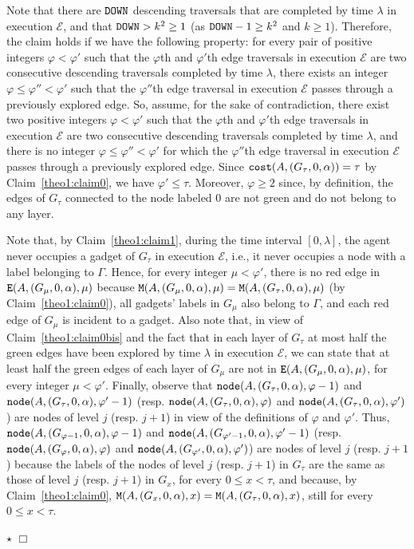 \documentclass[11pt]{article}
\newcommand{\qed}{\hfill $\Box$ \bigbreak}
\newenvironment{proof}{\noindent {\bf Proof.}}{\qed}
\newenvironment{proofclaim}{\noindent{\bf Proof of the claim.}}{\hfill$\star$}
\begin{document}
{\begin{proof}
\begin{proofclaim}
Note that there are ${\tt DOWN}$ descending traversals that are completed by time $\lambda$ in execution $\mathcal{E}$, and that ${\tt DOWN}>k^2\geq 1$ (as ${\tt DOWN}-1\geq k^2$ and $k\geq1$). Therefore, the claim holds if we have the following property: for every pair of positive integers $\varphi<\varphi'$ such that the $\varphi$th and $\varphi'$th edge traversals in execution $\mathcal{E}$ are two consecutive descending traversals completed by time $\lambda$, there exists an integer $\varphi\leq\varphi''<\varphi'$ such that the $\varphi''$th edge traversal in execution $\mathcal{E}$ passes through a previously explored edge. So, assume, for the sake of contradiction, there exist two positive integers $\varphi<\varphi'$ such that the $\varphi$th and $\varphi'$th edge traversals in execution $\mathcal{E}$ are two consecutive descending traversals completed by time $\lambda$, and there is no integer $\varphi\leq\varphi''<\varphi'$ for which the $\varphi''$th edge traversal in execution $\mathcal{E}$ passes through a previously explored edge. Since ${\tt cost}(A,(G_{\tau},0,\alpha))=\tau$ by Claim~\ref{theo1:claim0}, we have $\varphi'\leq\tau$. Moreover, $\varphi\geq2$ since, by definition, the edges of $G_{\tau}$ connected to the node labeled $0$ are not green and do not belong to any layer.

Note that, by Claim~\ref{theo1:claim1}, during the time interval $[0,\lambda]$, the agent never occupies a gadget of $G_{\tau}$ in execution $\mathcal{E}$, i.e., it never occupies a node with a label belonging to $\Gamma$. Hence, for every integer $\mu<\varphi'$, there is no red edge in ${\tt E}(A,(G_{\mu},0,\alpha),\mu)$ because ${\tt M}(A,(G_{\mu},0,\alpha),\mu)={\tt M}(A,(G_\tau,0,\alpha),\mu)$ (by Claim~\ref{theo1:claim0}), all gadgets' labels in $G_{\mu}$ also belong to $\Gamma$, and each red edge of $G_{\mu}$ is incident to a gadget. Also note that, in view of Claim~\ref{theo1:claim0bis} and the fact that in each layer of $G_{\tau}$ at most half the green edges have been explored by time $\lambda$ in execution $\mathcal{E}$, we can state that at least half the green edges of each layer of $G_{\mu}$ are not in ${\tt E}(A,(G_{\mu},0,\alpha),\mu)$, for every integer $\mu<\varphi'$. Finally, observe that ${\tt node}(A,(G_{\tau},0,\alpha),\varphi-1)$ and ${\tt node}(A,(G_{\tau},0,\alpha),\varphi'-1)$ (resp. ${\tt node}(A,(G_{\tau},0,\alpha),\varphi)$ and ${\tt node}(A,(G_{\tau},0,\alpha),\varphi')$) are nodes of level $j$ (resp. $j+1$) in view of the definitions of $\varphi$ and $\varphi'$. Thus, ${\tt node}(A,(G_{\varphi-1},0,\alpha),\varphi-1)$ and ${\tt node}(A,(G_{\varphi'-1},0,\alpha),\varphi'-1)$ (resp. ${\tt node}(A,(G_{\varphi},0,\alpha),\varphi)$ and ${\tt node}(A,(G_{\varphi'},0,\alpha),\varphi')$) are nodes of level $j$ (resp. $j+1$) because
the labels of the nodes of level $j$ (resp. $j+1$) in $G_{\tau}$ are the same as those of level $j$ (resp. $j+1$) in $G_{x}$, for every $0\leq x<\tau$, and because, by Claim~\ref{theo1:claim0},  ${\tt M}(A,(G_{x},0,\alpha),x)={\tt M}(A,(G_\tau,0,\alpha),x)$, still for every $0\leq x<\tau$. 


\end{proofclaim}
\end{proof}}
\end{document}
